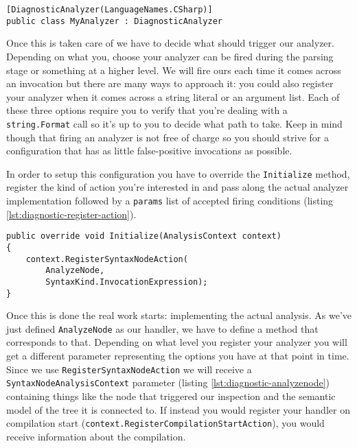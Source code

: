 \begin{lstlisting}[label={lst:diagnostic-supported-lang}]
[DiagnosticAnalyzer(LanguageNames.CSharp)]
public class MyAnalyzer : DiagnosticAnalyzer
\end{lstlisting}

Once this is taken care of we have to decide what should trigger our analyzer. Depending on what you, choose your analyzer can be fired during the parsing stage or something at a higher level. We will fire ours each time it comes across an \gls{invocation} but there are many ways to approach it: you could also register your analyzer when it comes across a string literal or an argument list. Each of these three options require you to verify that you're dealing with a \texttt{string.Format} call so it's up to you to decide what path to take. Keep in mind though that firing an analyzer is not free of charge so you should strive for a configuration that has as little false-positive \glspl{invocation} as possible.

In order to setup this configuration you have to override the \texttt{Initialize} method, register the kind of action you're interested in and pass along the actual analyzer implementation followed by a \texttt{params} list of accepted firing conditions (listing \ref{lst:diagnostic-register-action}).

\begin{lstlisting}[label={lst:diagnostic-register-action}]
public override void Initialize(AnalysisContext context)
{
	context.RegisterSyntaxNodeAction(
		AnalyzeNode, 
		SyntaxKind.InvocationExpression);
}
\end{lstlisting}

Once this is done the real work starts: implementing the actual analysis. As we've just defined \texttt{AnalyzeNode} as our handler, we have to define a method that corresponds to that. Depending on what level you register your analyzer you will get a different parameter representing the options you have at that point in time. Since we use \texttt{RegisterSyntaxNodeAction} we will receive a \texttt{SyntaxNodeAnalysisContext} parameter (listing \ref{lst:diagnostic-analyzenode}) containing things like the node that triggered our inspection and the semantic model of the tree it is connected to. If instead you would register your handler on compilation start (\texttt{context.RegisterCompilationStartAction}), you would receive information about the compilation.


